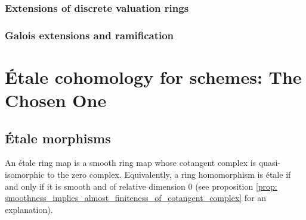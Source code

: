             \subsubsection{Extensions of discrete valuation rings}
                
            
            \subsubsection{Galois extensions and ramification}
    
    \section{\'Etale cohomology for schemes: The Chosen One}
        \subsection{\'Etale morphisms} \label{subsection: etale_morphisms}
            \begin{definition} \label{def: etale_morphisms} 
                An \'etale ring map is a smooth ring map whose cotangent complex is quasi-isomorphic to the zero complex. Equivalently, a ring homomorphism is \'etale if and only if it is smooth and of relative dimension $0$ (see proposition \ref{prop: smoothness_implies_almost_finiteness_of_cotangent_complex} for an explanation). 
            \end{definition}
            
